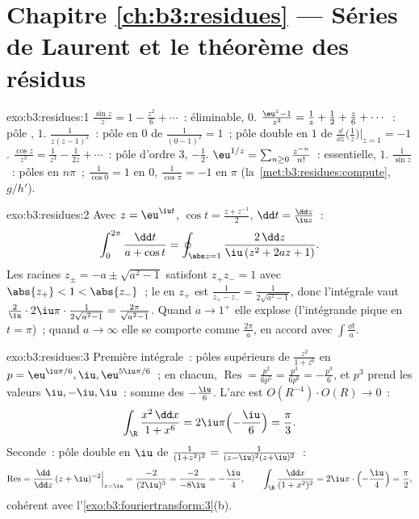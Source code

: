 \section*{Chapitre \ref{ch:b3:residues} --- Séries de Laurent et
le théorème des résidus}

\begin{solution}{exo:b3:residues:1}
$\frac{\sin z}z = 1 - \frac{z^2}6 + \cdots$~: éliminable,
 $0$. $\frac{\eu^z - 1}{z^2} = \frac1z + \frac12 +
\frac z6 + \cdots$~: pôle ,  $1$.
$\frac1{z(z-1)^2}$~: pôle  en $0$ de 
$\frac1{(0-1)^2} = 1$~; pôle double en $1$ de 
$\frac{\dd}{\dd z}\bigl(\frac1z\bigr)\big|_{z=1} = -1$.
$\frac{\cos z}{z^3} = \frac1{z^3} - \frac1{2z} + \cdots$~:
pôle d'ordre $3$,  $-\frac12$. $\eu^{1/z} =
\sum_{n\geq0} \frac{z^{-n}}{n!}$~: essentielle,  $1$.
$\frac1{\sin z}$~: pôles  en $n\pi$~; 
$\frac1{\cos 0} = 1$ en $0$, $\frac1{\cos\pi} = -1$ en $\pi$
(la~\cref{met:b3:residues:compute}, $g/h'$).
\end{solution}

\begin{solution}{exo:b3:residues:2}
Avec $z = \eu^{\iu t}$, $\cos t = \frac{z + z^{-1}}2$, $\dd t
= \frac{\dd z}{\iu z}$~:
\[
\int_0^{2\pi}\frac{\dd t}{a + \cos t}
= \oint_{\abs z = 1}\frac{2\,\dd z}{\iu\,(z^2 + 2az + 1)} .
\]
Les racines $z_\pm = -a \pm \sqrt{a^2 - 1}$ satisfont
$z_+z_- = 1$ avec $\abs{z_+} < 1 < \abs{z_-}$~; le  en
$z_+$ est $\frac{1}{z_+ - z_-} = \frac1{2\sqrt{a^2-1}}$,
donc l'intégrale vaut $\frac2\iu\cdot2\iu\pi\cdot
\frac1{2\sqrt{a^2-1}} = \frac{2\pi}{\sqrt{a^2-1}}$. Quand
$a \to 1^+$ elle explose (l'intégrande pique en $t = \pi$)~;
quand $a \to \infty$ elle se comporte comme $\frac{2\pi}a$,
en accord avec $\int\frac{\dd t}a$.
\end{solution}

\begin{solution}{exo:b3:residues:3}
Première intégrale~: pôles supérieurs de $\frac{z^2}{1+z^6}$
en $p = \eu^{\iu\pi/6}, \iu, \eu^{5\iu\pi/6}$~; en chacun,
$\operatorname{Res} = \frac{p^2}{6p^5} = \frac{p^3}{6p^6} =
-\frac{p^3}6$, et $p^3$ prend les valeurs $\iu, -\iu, \iu$~:
somme des  $-\frac{\iu}{6}$. L'arc est
$O(R^{-4})\cdot O(R) \to 0$~:
\[
\int_\R\frac{x^2\,\dd x}{1 + x^6} =
2\iu\pi\Bigl(-\frac \iu6\Bigr) = \frac\pi3 .
\]
Seconde~: pôle double en $\iu$ de $\frac1{(1+z^2)^2} =
\frac1{(z-\iu)^2(z+\iu)^2}$~:
\[
\operatorname{Res} = \frac{\dd}{\dd z}\,(z +
\iu)^{-2}\Big|_{z=\iu} = \frac{-2}{(2\iu)^3} =
\frac{-2}{-8\iu} = -\frac\iu4,
\qquad
\int_\R\frac{\dd x}{(1+x^2)^2} =
2\iu\pi\cdot\Bigl(-\frac\iu4\Bigr) = \frac\pi2 ,
\]
cohérent avec l'\cref{exo:b3:fouriertransform:3}(b).
\end{solution}

